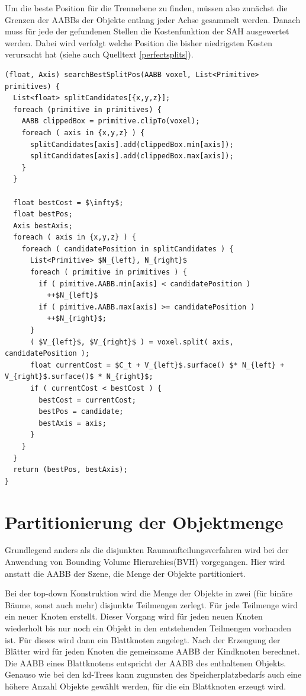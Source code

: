 Um die beste Position für die Trennebene zu finden, müssen also zunächst die Grenzen der AABBs der Objekte entlang jeder Achse gesammelt werden. Danach muss für jede der gefundenen Stellen die Kostenfunktion der SAH ausgewertet werden. Dabei wird verfolgt welche Position die bisher niedrigsten Kosten verursacht hat (siehe auch Quelltext \ref{perfectsplits}).

\begin{lstlisting}[float,mathescape=true,caption=Suche nach der besten Trennebene in $O(n^2)$  ,label=perfectsplits]
(float, Axis) searchBestSplitPos(AABB voxel, List<Primitive> primitives) {
  List<float> splitCandidates[{x,y,z}];
  foreach (primitive in primitives) {
    AABB clippedBox = primitive.clipTo(voxel);
    foreach ( axis in {x,y,z} ) {
      splitCandidates[axis].add(clippedBox.min[axis]);
      splitCandidates[axis].add(clippedBox.max[axis]);
    }
  }

  float bestCost = $\infty$;
  float bestPos;
  Axis bestAxis;
  foreach ( axis in {x,y,z} ) {
    foreach ( candidatePosition in splitCandidates ) {
      List<Primitive> $N_{left}, N_{right}$
      foreach ( primitive in primitives ) {
        if ( pimitive.AABB.min[axis] < candidatePosition )
          ++$N_{left}$
        if ( pimitive.AABB.max[axis] >= candidatePosition )
          ++$N_{right}$;
      }
      ( $V_{left}$, $V_{right}$ ) = voxel.split( axis, candidatePosition );
      float currentCost = $C_t + V_{left}$.surface() $* N_{left} + V_{right}$.surface()$ * N_{right}$;
      if ( currentCost < bestCost ) {
        bestCost = currentCost;
        bestPos = candidate;
        bestAxis = axis;
      }
    }
  }
  return (bestPos, bestAxis);
}

\end{lstlisting}

\section{Partitionierung der Objektmenge}
Grundlegend anders als die disjunkten Raumaufteilungsverfahren wird bei der Anwendung von Bounding Volume Hierarchies(BVH) vorgegangen. Hier wird anstatt die AABB der Szene, die Menge der Objekte partitioniert. 

Bei der top-down Konstruktion wird die Menge der Objekte in zwei (für binäre Bäume, sonst auch mehr) disjunkte Teilmengen zerlegt. Für jede Teilmenge wird ein neuer Knoten erstellt. Dieser Vorgang wird für jeden neuen Knoten wiederholt bis nur noch ein Objekt in den entstehenden Teilmengen vorhanden ist. Für dieses wird dann ein Blattknoten angelegt. Nach der Erzeugung der Blätter wird für jeden Knoten die gemeinsame AABB der Kindknoten berechnet. Die AABB eines Blattknotens entspricht der AABB des enthaltenen Objekts. Genauso wie bei den kd-Trees kann zugunsten des Speicherplatzbedarfs auch eine höhere Anzahl Objekte gewählt werden, für die ein Blattknoten erzeugt wird.

